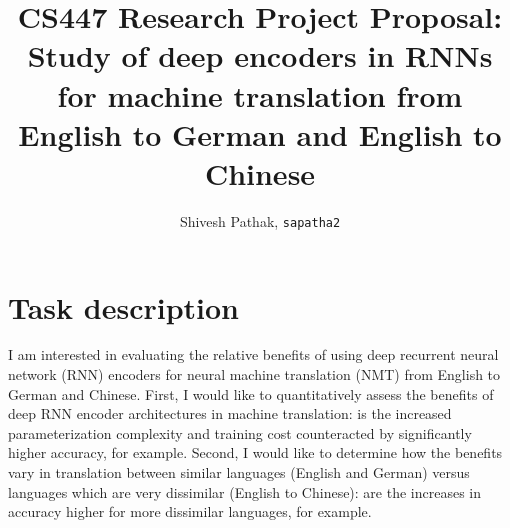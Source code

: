 \documentclass[11pt,letterpaper]{article}
\newcommand{\blue}[1]{\textcolor{RoyalBlue}{#1}}
\newcommand{\instructions}[1]{\blue{\textit{#1}}}
\renewcommand{\instructions}[1]{}
\begin{document}
\title{CS447 Research Project Proposal: \\ Study of deep encoders in RNNs for machine translation from English to German and English to Chinese}
\author{Shivesh Pathak, \texttt{sapatha2}}
\maketitle



\instructions{If you are taking CS447 for 4 hours credit, you need to
  either do a research project or a literature review.\\
This is a \LaTeX template for the initial proposal for the research project,  but should also give you a start on the final report.\\
The blue pieces of text  in this template are either instructions ({\tt$\backslash$instructions\{...\}}) or indicate where you need to fill in something ({\tt$\backslash$fillme\{...\}}).  
You should replace all the {\tt$\backslash$fillme\{...\}} commands with your own text.
To make the instructions disappear, please uncomment the 
\begin{center}
{\tt$\backslash$renewcommand\{$\backslash$instructions\}[1]\{\}}\\
\end{center}
lines in the preamble (just above  {\tt $\backslash$begin\{document\}} of this .tex file) by removing the leading \% marks, 
recompile (run \LaTeX again) and submit the PDF on Compass.}

\section*{Task description}
\instructions{Describe the task you want to tackle in your project.}
I am interested in evaluating the relative benefits of using deep recurrent neural network (RNN) encoders for neural machine translation (NMT) from English to German and Chinese. 
First, I would like to quantitatively assess the benefits of deep RNN encoder architectures in machine translation: is the increased parameterization complexity and training cost counteracted by significantly higher accuracy, for example.
Second, I would like to determine how the benefits vary in translation between similar languages (English and German) versus languages which are very dissimilar (English to Chinese): are the increases in accuracy higher for more dissimilar languages, for example.
\end{document}
